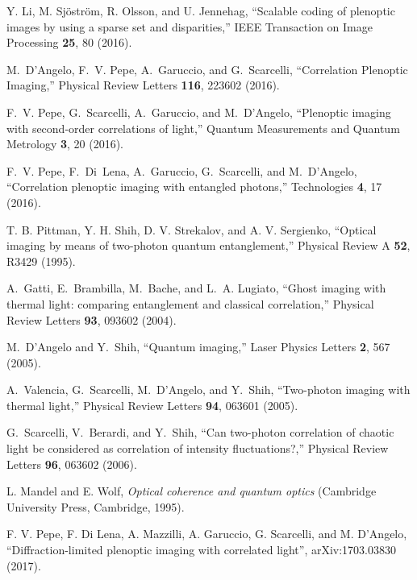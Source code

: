 \documentclass[aps,pra,amssymb,twocolumn,amsmath,superscriptaddress,showpacs,10pt]{revtex4-1}
\begin{document}
\begin{thebibliography}{10}
Y. Li, M. Sj\"ostr\"om, R. Olsson, and U. Jennehag, ``Scalable coding of plenoptic images by using a sparse set and disparities,'' IEEE Transaction on Image Processing \textbf{25}, 80 (2016).

M.~D'Angelo, F.~V. Pepe, A.~Garuccio, and G.~Scarcelli, ``Correlation Plenoptic Imaging,'' Physical Review Letters \textbf{116}, 223602 (2016).

F.~V. Pepe, G.~Scarcelli, A.~Garuccio, and M.~D'Angelo, ``Plenoptic imaging with second-order correlations of light,'' Quantum Measurements and Quantum Metrology \textbf{3}, 20 (2016).

F.~V. Pepe, F.~Di~Lena, A.~Garuccio, G.~Scarcelli, and M.~D'Angelo, ``Correlation plenoptic imaging with entangled photons,'' Technologies \textbf{4}, 17 (2016).

T. B. Pittman, Y. H. Shih, D. V. Strekalov, and A. V. Sergienko, ``Optical imaging by means of two-photon quantum entanglement,'' Physical Review A \textbf{52},  R3429 (1995).

A.~Gatti, E.~Brambilla, M.~Bache, and L.~A. Lugiato, ``Ghost imaging with thermal light: comparing entanglement and classical correlation,'' Physical Review Letters \textbf{93}, 093602 (2004).

M.~D'Angelo and Y.~Shih, ``Quantum imaging,'' Laser Physics Letters \textbf{2}, 567 (2005).

A.~Valencia, G.~Scarcelli, M.~D’Angelo, and Y.~Shih, ``Two-photon imaging with thermal light,'' Physical Review Letters \textbf{94}, 063601 (2005).

G.~Scarcelli, V.~Berardi, and Y.~Shih, ``Can two-photon correlation of chaotic light be considered as correlation of intensity fluctuations?,'' Physical Review Letters \textbf{96}, 063602 (2006).

L. Mandel and E. Wolf, \textit{Optical coherence and quantum optics} (Cambridge University Press, Cambridge, 1995).

F. V. Pepe, F. Di Lena, A. Mazzilli, A. Garuccio, G. Scarcelli, and M. D'Angelo, ``Diffraction-limited plenoptic imaging with correlated light'', arXiv:1703.03830 (2017).


\end{thebibliography}
\end{document}

